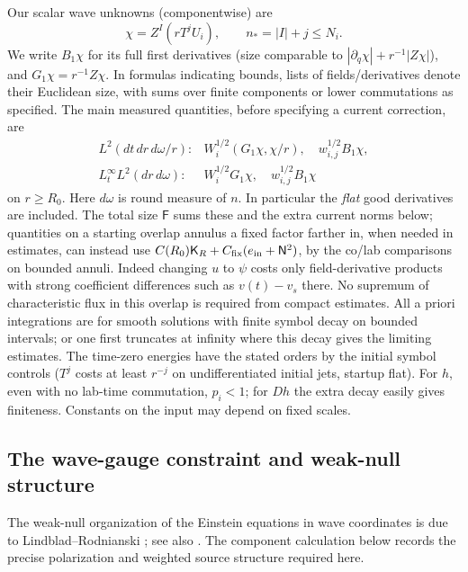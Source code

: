 Our scalar wave unknowns (componentwise) are
\begin{equation*}
\chi=Z^I(rT^j U_i),\qquad n_*=|I|+j\le N_i .
\end{equation*}
We write \(B_1\chi\) for its full first derivatives (size comparable to \(|\partial_q\chi|+r^{-1}|Z\chi|\)), and \(G_1\chi=r^{-1}Z\chi\). In formulas indicating bounds, lists of fields/derivatives denote their Euclidean size, with sums over finite components or lower commutations as specified. The main measured quantities, before specifying a current correction, are
\begin{equation}\label{fe:F1}
\begin{array}{ll}
 L^2(dt\,dr\,d\omega/r): & W_i^{1/2}(G_1\chi,\chi/r),\quad
                       w_{i,j}^{1/2}B_1\chi ,\\
 L^\infty_t L^2(dr\,d\omega):& W_i^{1/2} G_1\chi,\quad
                       w_{i,j}^{1/2}B_1\chi
 \end{array}
\end{equation}
on \(r\ge R_0\). Here \(d\omega\) is round measure of \(n\). In particular the \emph{flat} good derivatives are included. The total size \(\mathsf F\) sums these and the extra current norms below; quantities on a starting overlap annulus a fixed factor farther in, when needed in estimates, can instead use \(C(R_0)\mathsf K_R+C_{\rm fix}(e_{\rm in}+\mathsf N^2)\), by the co/lab comparisons on bounded annuli. Indeed changing \(u\) to \(\psi\) costs only field-derivative products with strong coefficient differences such as \(v(t)-v_s\) there. No supremum of characteristic flux in this overlap is required from compact estimates. All a priori integrations are for smooth solutions with finite symbol decay on bounded intervals; or one first truncates at infinity where this decay gives the limiting estimates. The time-zero energies have the stated orders by the initial symbol controls (\(T^j\) costs at least \(r^{-j}\) on undifferentiated initial jets, startup flat). For \(h\), even with no lab-time commutation, \(p_i<1\); for \(D h\) the extra decay easily gives finiteness. Constants on the input may depend on fixed scales.

\subsection{The wave-gauge constraint and weak-null structure}\label{fe:weak-null}

The weak-null organization of the Einstein equations in wave coordinates
is due to Lindblad--Rodnianski \cite[Sections~3--5]{LindbladRodnianski2003}; see also
\cite{LindbladRodnianski2010}.
The component calculation below records the precise polarization and
weighted source structure required here.



